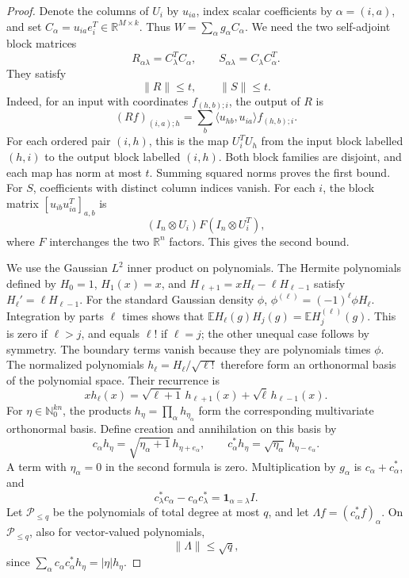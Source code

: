 \documentclass[11pt]{article}
\newcommand{\R}{\mathbb R}
\newcommand{\E}{\mathbb E}
\newcommand{\ind}{\mathbf 1}
\begin{document}
\begin{proof}
Denote the columns of \(U_i\) by \(u_{ia}\), index scalar
coefficients by \(\alpha=(i,a)\), and set
\(C_\alpha=u_{ia}e_i^T\in\R^{M\times k}\).
Thus \(W=\sum_\alpha g_\alpha C_\alpha\).
We need the two self-adjoint block matrices
\begin{equation}\label{eq:blocks}
 R_{\alpha\lambda}=C_\lambda^TC_\alpha,\qquad
 S_{\alpha\lambda}=C_\lambda C_\alpha^T.
\end{equation}
They satisfy
\begin{equation}\label{eq:block-norms}
 \|R\|\le t,\qquad \|S\|\le t.
\end{equation}
Indeed, for an input with coordinates \(f_{(h,b);i}\), the output
of \(R\) is
\[
 (Rf)_{(i,a);h}
   =\sum_b\langle u_{hb},u_{ia}\rangle f_{(h,b);i}.
\]
For each ordered pair \((i,h)\), this is the map \(U_i^TU_h\)
from the input block labelled \((h,i)\) to the output block
labelled \((i,h)\). Both block families are disjoint, and each
map has norm at most \(t\). Summing squared norms proves the first
bound. For \(S\), coefficients with distinct column indices vanish.
For each \(i\), the block matrix \([u_{ib}u_{ia}^T]_{a,b}\) is
\[
 (I_n\otimes U_i)F(I_n\otimes U_i^T),
\]
where \(F\) interchanges the two \(\R^n\) factors. This gives the
second bound.

We use the Gaussian \(L^2\) inner product on polynomials.
The Hermite polynomials defined by
\(H_0=1\), \(H_1(x)=x\), and
\(H_{\ell+1}=xH_\ell-\ell H_{\ell-1}\) satisfy
\(H_\ell'=\ell H_{\ell-1}\).
For the standard Gaussian density \(\phi\),
\(\phi^{(\ell)}=(-1)^\ell\phi H_\ell\).
Integration by parts \(\ell\) times shows that
\(\E H_\ell(g)H_j(g)=\E H_j^{(\ell)}(g)\).
This is zero if \(\ell>j\), and equals \(\ell!\) if \(\ell=j\);
the other unequal case follows by symmetry.
The boundary terms vanish because they are polynomials times \(\phi\).
The normalized polynomials \(h_\ell=H_\ell/\sqrt{\ell!}\) therefore
form an orthonormal basis of the polynomial space. Their recurrence is
\[
 xh_\ell(x)=\sqrt{\ell+1}\,h_{\ell+1}(x)
                    +\sqrt{\ell}\,h_{\ell-1}(x).
\]
For \(\eta\in\mathbb N_0^{kn}\), the products
\(h_\eta=\prod_\alpha h_{\eta_\alpha}\) form the corresponding
multivariate orthonormal basis. Define creation and annihilation on
this basis by
\[
 c_\alpha h_\eta=\sqrt{\eta_\alpha+1}\,h_{\eta+e_\alpha},
 \qquad
 c_\alpha^*h_\eta=\sqrt{\eta_\alpha}\,h_{\eta-e_\alpha}.
\]
A term with \(\eta_\alpha=0\) in the second formula is zero.
Multiplication by \(g_\alpha\) is \(c_\alpha+c_\alpha^*\), and
\[
 c_\lambda^*c_\alpha-c_\alpha c_\lambda^*
   =\ind_{\alpha=\lambda}I.
\]
Let \(\mathcal P_{\le q}\) be the polynomials of total degree at
most \(q\), and let \(\Lambda f=(c_\alpha^*f)_\alpha\).
On \(\mathcal P_{\le q}\), also for vector-valued polynomials,
\begin{equation}\label{eq:annihilation}
 \|\Lambda\|\le\sqrt q,
\end{equation}
since \(\sum_\alpha c_\alpha c_\alpha^*h_\eta=|\eta|h_\eta\).


\end{proof}
\end{document}
